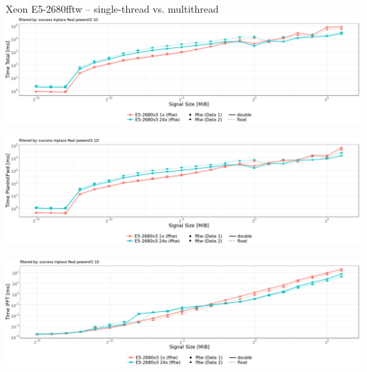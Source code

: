 \documentclass[t,11pt,hyperref={
  pdftitle = {gearshifft},
  pdfsubject = {gearshifft},
  pdfborder={0 0 0},
  colorlinks=true,
  urlcolor=red,
  citecolor=red,
  linkcolor=red,
  pdfauthor={Peter Steinbach, Matthias Werner}
  }
]{beamer}
\begin{document}
\begin{frame}{Xeon E5-2680}{fftw -- single-thread vs. multithread}
  \includegraphics[width=\textwidth]{fftw-measure-single-multi.png}
  
\vspace{-2em}  \includegraphics[width=\textwidth]{fftw-measure-single-multi-planning.png}
  
\vspace{-2em}  \includegraphics[width=\textwidth]{fftw-measure-single-multi-ifft.png}
\end{frame}
\end{document}
